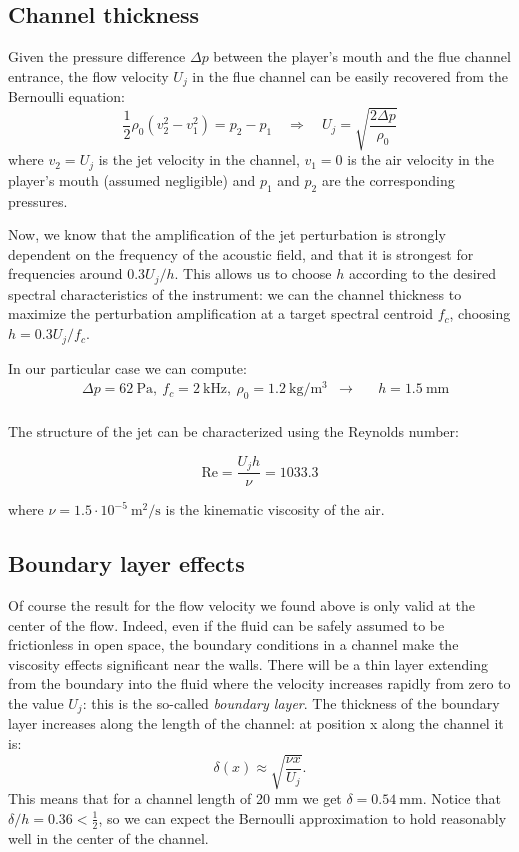 \documentclass[a4paper]{article}
\begin{document}
\subsection{Channel thickness}

Given the pressure difference $\Delta p$ between the player's mouth and the flue channel entrance, the flow velocity $U_j$ in the flue channel can be easily recovered from the Bernoulli equation:
\[
	\frac{1}{2} \rho_0 \left( v_2^2 - v_1^2 \right) = p_2 - p_1 \quad \Rightarrow \quad
	U_j = \sqrt{\frac{2\Delta p}{\rho_0}}
\]
where $v_2 = U_j$ is the jet velocity in the channel, $v_1 = 0$ is the air velocity in the player's mouth (assumed negligible) and $p_1$ and $p_2$ are the corresponding pressures.

Now, we know that the amplification of the jet perturbation is strongly dependent on the frequency of the acoustic field, and that it is strongest for frequencies around $0.3U_j / h$. This allows us to choose $h$ according to the desired spectral characteristics of the instrument: we can  the channel thickness to maximize the perturbation amplification at a target spectral centroid $f_c$, choosing $ h = 0.3 U_j / f_c$.

In our particular case we can compute:
\begin{align*}
		&\Delta p = \SI{62}{\pascal},~ f_c = \SI{2}{\kilo\hertz},~ \rho_0 = \SI{1.2}{\kilogram\per\meter\cubed} &\longrightarrow \quad &\boxed{h = \SI{1.5}{\milli\metre}}\\
\end{align*}

The structure of the jet can be characterized using the Reynolds number:

$$ \mathrm{Re} = \frac{U_j h}{\nu} = 1033.3 $$

where $\nu = 1.5 \cdot 10^{-5}~ \si{\meter\squared\per\second}$ is the kinematic viscosity of the air.

\subsection{Boundary layer effects}
Of course the result for the flow velocity we found above is only valid at the center of the flow. Indeed, even if the fluid can be safely assumed to be frictionless in open space, the boundary conditions in a channel make the viscosity effects significant near the walls. There will be a thin layer extending from the boundary into the fluid where the velocity increases rapidly from zero to the value $U_j$: this is the so-called \emph{boundary layer}. The thickness of the boundary layer increases along the length of the channel: at position x along the channel it is:
$$ \delta(x) \approx \sqrt{\frac{\nu x}{U_j}}. $$
This means that for a channel length of 20 mm we get $\delta = \SI{0.54}{\milli\meter}$. Notice that $\delta/h = 0.36 < \frac{1}{2}$, so we can expect the Bernoulli approximation to hold reasonably well in the center of the channel.
\end{document}
